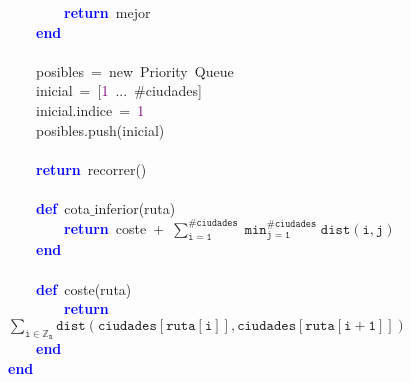 \mbox{}\ \ \ \ \ \ \ \ \textbf{\textcolor{Blue}{return}}\ mejor \\
\mbox{}\ \ \ \ \textbf{\textcolor{Blue}{end}} \\
\mbox{} \\
\mbox{}\ \ \ \ posibles\ \textcolor{BrickRed}{=}\ new\ Priority\ Queue \\
\mbox{}\ \ \ \ inicial\ \textcolor{BrickRed}{=}\ \textcolor{BrickRed}{[}\textcolor{Purple}{1}\ \textcolor{BrickRed}{...}\ \#ciudades\textcolor{BrickRed}{]} \\
\mbox{}\ \ \ \ inicial\textcolor{BrickRed}{.}indice\ \textcolor{BrickRed}{=}\ \textcolor{Purple}{1} \\
\mbox{}\ \ \ \ posibles\textcolor{BrickRed}{.}push\textcolor{BrickRed}{(}inicial\textcolor{BrickRed}{)} \\
\mbox{} \\
\mbox{}\ \ \ \ \textbf{\textcolor{Blue}{return}}\ recorrer\textcolor{BrickRed}{()} \\
\mbox{} \\
\mbox{}\ \ \ \ \textbf{\textcolor{Blue}{def}}\ cota$\_$inferior\textcolor{BrickRed}{(}ruta\textcolor{BrickRed}{)} \\
\mbox{}\ \ \ \ \ \ \ \ \textbf{\textcolor{Blue}{return}}\ coste\ \textcolor{BrickRed}{+}\ $\mathtt{\sum_{i=1}^{\#ciudades} \min_{j=1}^{\#ciudades} dist(i,j)}$ \\
\mbox{}\ \ \ \ \textbf{\textcolor{Blue}{end}} \\
\mbox{} \\
\mbox{}\ \ \ \ \textbf{\textcolor{Blue}{def}}\ coste\textcolor{BrickRed}{(}ruta\textcolor{BrickRed}{)} \\
\mbox{}\ \ \ \ \ \ \ \ \textbf{\textcolor{Blue}{return}}\ $\mathtt{\sum_{i \in \mathbb{Z}_n} dist(ciudades[ruta[i]], ciudades[ruta[i+1]])}$ \\
\mbox{}\ \ \ \ \textbf{\textcolor{Blue}{end}} \\
\mbox{}\textbf{\textcolor{Blue}{end}} \\
\mbox{}
